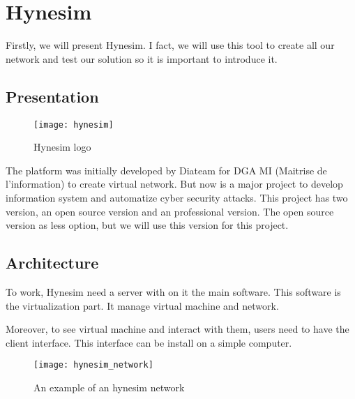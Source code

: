 
\chapter{Hynesim}
\label{chap:hynesim}

Firstly, we will present Hynesim. I fact, we will use this tool to create all our network and test our solution so
it is important to introduce it.

\section{Presentation}

\begin{figure}[h]
  \centering
  \texttt{[image: hynesim]}
  \caption{Hynesim logo}
  \label{fig:hynesim}
\end{figure}



The platform was initially developed by Diateam for DGA MI (Maitrise de l'information) to create virtual network.
But now is a major project to develop information system and automatize cyber security attacks. This project has
two version, an open source version and an professional version. The open source version as less option, but we
will use this version for this project.

\section{Architecture}

To work, Hynesim need a server with on it the main software. This software is the virtualization part. It manage
virtual machine and network.

Moreover, to see virtual machine and interact with them, users need to have the client interface. This interface
can be install on a simple computer.

\begin{figure}[h]
  \centering
  \texttt{[image: hynesim\_network]}
  \caption{An example of an hynesim network}
\end{figure}





